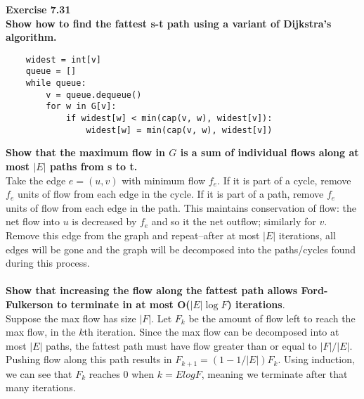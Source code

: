 \documentclass{article}
\newenvironment{problem}[2][Exercise]
    { \begin{mdframed}[backgroundcolor=gray!20] \textbf{#1 #2} \\}
    {  \end{mdframed}}
\begin{document}
\begin{problem}{7.31}
\textbf{Show how to find the fattest s-t path using a variant of Dijkstra's algorithm.}
\begin{lstlisting}
    widest = int[v]
    queue = []
    while queue:
        v = queue.dequeue()
        for w in G[v]:
            if widest[w] < min(cap(v, w), widest[v]):
                widest[w] = min(cap(v, w), widest[v])
\end{lstlisting}

\textbf{Show that the maximum flow in $G$ is a sum of individual flows along at most $|E|$ paths from s to t.} \\
Take the edge $e = (u, v)$ with minimum flow $f_e$. If it is part of a cycle, remove $f_e$ units of flow from each edge in the cycle. If it is part of a path, remove $f_e$ units of flow from each edge in the path. This maintains conservation of flow: the net flow into $u$ is decreased by $f_e$ and so it the net outflow; similarly for $v$. Remove this edge from the graph and repeat--after at most $|E|$ iterations, all edges will be gone and the graph will be decomposed into the paths/cycles found during this process. \\ \\

\textbf{Show that increasing the flow along the fattest path allows Ford-Fulkerson to terminate in at most O($|E| \log F$) iterations}. \\
Suppose the max flow has size $|F|$. Let $F_k$ be the amount of flow left to reach the max flow, in the $k$th iteration. Since the max flow can be decomposed into at most $|E|$ paths, the fattest path must have flow greater than or equal to $|F| / |E|$. Pushing flow along this path results in $F_{k + 1} = (1 - 1 / |E|)F_k$. Using induction, we can see that $F_{k}$ reaches 0 when $k = E log F$, meaning we terminate after that many iterations.
\end{problem}
\end{document}
